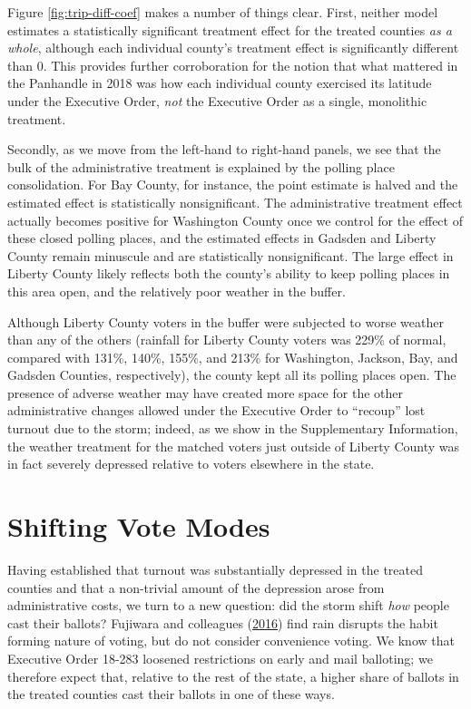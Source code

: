 \documentclass[
  12pt,
]{article}
\begin{document}
Figure \ref{fig:trip-diff-coef} makes a number of things clear. First, neither model estimates a statistically significant treatment effect for the treated counties \emph{as a whole}, although each individual county's treatment effect is significantly different than 0. This provides further corroboration for the notion that what mattered in the Panhandle in 2018 was how each individual county exercised its latitude under the Executive Order, \emph{not} the Executive Order as a single, monolithic treatment.

Secondly, as we move from the left-hand to right-hand panels, we see that the bulk of the administrative treatment is explained by the polling place consolidation. For Bay County, for instance, the point estimate is halved and the estimated effect is statistically nonsignificant. The administrative treatment effect actually becomes positive for Washington County once we control for the effect of these closed polling places, and the estimated effects in Gadsden and Liberty County remain minuscule and are statistically nonsignificant. The large effect in Liberty County likely reflects both the county's ability to keep polling places in this area open, and the relatively poor weather in the buffer.

Although Liberty County voters in the buffer were subjected to worse weather than any of the others (rainfall for Liberty County voters was 229\% of normal, compared with 131\%, 140\%, 155\%, and 213\% for Washington, Jackson, Bay, and Gadsden Counties, respectively), the county kept all its polling places open. The presence of adverse weather may have created more space for the other administrative changes allowed under the Executive Order to ``recoup'' lost turnout due to the storm; indeed, as we show in the Supplementary Information, the weather treatment for the matched voters just outside of Liberty County was in fact severely depressed relative to voters elsewhere in the state.

\hypertarget{shifting-vote-modes}{%
\section*{Shifting Vote Modes}\label{shifting-vote-modes}}

Having established that turnout was substantially depressed in the treated counties and that a non-trivial amount of the depression arose from administrative costs, we turn to a new question: did the storm shift \emph{how} people cast their ballots? Fujiwara and colleagues (\protect\hyperlink{ref-Fujiwara2016}{2016}) find rain disrupts the habit forming nature of voting, but do not consider convenience voting. We know that Executive Order 18-283 loosened restrictions on early and mail balloting; we therefore expect that, relative to the rest of the state, a higher share of ballots in the treated counties cast their ballots in one of these ways.
\end{document}

